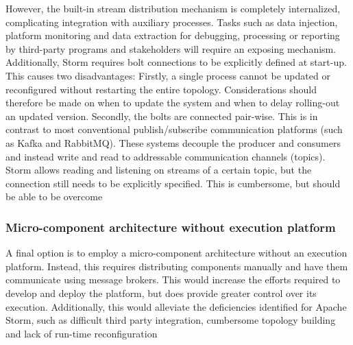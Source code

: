 However, the built-in stream distribution mechanism is completely internalized, complicating integration with auxiliary processes. Tasks such as data injection, platform monitoring and data extraction for debugging, processing or reporting by third-party programs and stakeholders will require an exposing mechanism. Additionally, Storm requires bolt connections to be explicitly defined at start-up. This causes two disadvantages: Firstly, a single process cannot be updated or reconfigured without restarting the entire topology. Considerations should therefore be made on when to update the system and when to delay rolling-out an updated version. Secondly, the bolts are connected pair-wise. This is in contrast to most conventional publish/subscribe communication platforms (such as Kafka and RabbitMQ). These systems decouple the producer and consumers and instead write and read to addressable communication channels (topics). Storm allows reading and listening on streams of a certain topic, but the connection still needs to be explicitly specified. This is cumbersome, but should be able to be overcome

\subsubsection*{Micro-component architecture without execution platform}
A final option is to employ a micro-component architecture without an execution platform. Instead, this requires distributing components manually and have them communicate using message brokers. This would increase the efforts required to develop and deploy the platform, but does provide greater control over its execution. Additionally, this would alleviate the deficiencies identified for Apache Storm, such as difficult third party integration, cumbersome topology building and lack of run-time reconfiguration

